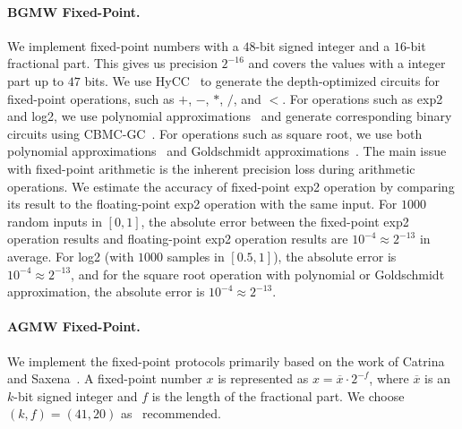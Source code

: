 \paragraph{BGMW Fixed-Point.}
We implement fixed-point numbers with a $48$-bit signed integer and a $16$-bit fractional part.
This gives us precision $2^{-16}$ and covers the values with a integer part up to $47$ bits.
We use HyCC~\cite{buscher2018hycc} to generate the depth-optimized circuits for fixed-point operations, such as $+$, $-$, $*$, $/$, and $<$.
For operations such as exp2 and log2, we use polynomial approximations~\cite{hart1978computer,aly2019benchmarking} and generate corresponding binary circuits using CBMC-GC~\cite{buscher2016compiling}.
For operations such as square root, we use both polynomial approximations~\cite{hart1978computer} and Goldschmidt approximations~\cite{markstein2004software,aly2019benchmarking}.
The main issue with fixed-point arithmetic is the inherent precision loss during arithmetic operations.
We estimate the accuracy of fixed-point exp2 operation by comparing its result to the floating-point exp2 operation with the same input.
For $1000$ random inputs in $\left[0,1\right]$, the absolute error between the fixed-point exp2 operation results and floating-point exp2 operation results are $10^{-4}\approx 2^{-13}$ in average.
For log2 (with $1000$ samples in $\left[0.5,1\right] $), the absolute error is $10^{-4}\approx 2^{-13}$, and for the square root operation with polynomial or Goldschmidt approximation, the absolute error is $10^{-4}\approx 2^{-13}$.

\paragraph{AGMW Fixed-Point.}
We implement the \arithmeticGMW fixed-point protocols primarily based on the work of Catrina and Saxena~\cite{catrina2010secure}. A fixed-point number $x$ is represented as $x = \overline{x}\cdot  2^{-f}$, where $\overline{x}$ is an $k$-bit signed integer and $f$ is the length of the fractional part.
We choose $\left(k,f\right)=\left(41,20\right)  $ as~\cite{aly2021scale} recommended.

